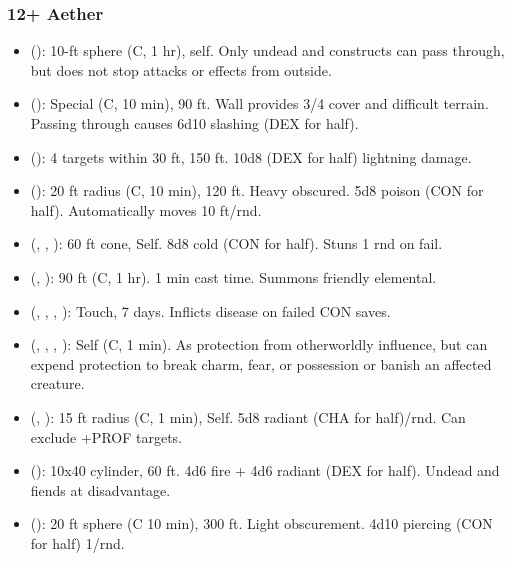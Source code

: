 \subsubsection{12+ Aether}
\begin{itemize}
	\item {} (): 10-ft sphere (C, 1 hr), self. Only undead and constructs can pass through, but does not stop attacks or effects from outside.
	\item {} (): Special (C, 10 min), 90 ft. Wall provides 3/4 cover and difficult terrain. Passing through causes 6d10 slashing (DEX for half).
	\item {} (): 4 targets within 30 ft, 150 ft. 10d8 (DEX for half) lightning damage. 
	\item {} (): 20 ft radius (C, 10 min), 120 ft. Heavy obscured. 5d8 poison (CON for half). Automatically moves 10 ft/rnd. 
	\item {} (, , ): 60 ft cone, Self. 8d8 cold (CON for half). Stuns 1 rnd on fail.
	\item {} (, ): 90 ft (C, 1 hr). 1 min cast time. Summons friendly elemental.
	\item {} (, , , ): Touch, 7 days. Inflicts disease on failed CON saves.
	\item {} (, , , ): Self (C, 1 min). As protection from otherworldly influence, but can expend protection to break charm, fear, or possession or banish an affected creature.
	\item {} (, ): 15 ft radius (C, 1 min), Self. 5d8 radiant (CHA for half)/rnd. Can exclude +PROF targets.
	\item {} (): 10x40 cylinder, 60 ft. 4d6 fire + 4d6 radiant (DEX for half). Undead and fiends at disadvantage.
	\item {} (): 20 ft sphere (C 10 min), 300 ft. Light obscurement. 4d10 piercing (CON for half) 1/rnd.

\end{itemize}
